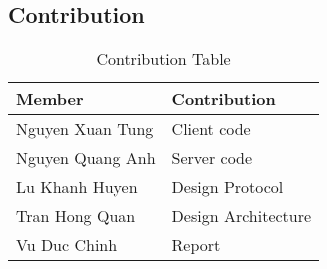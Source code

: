 \documentclass[13pt]{article}
\begin{document}
\subsection{Contribution}
\noindent%
\begin{table}[ht!]
  \begin{center}
    \label{tab:table1}
    \begin{tabular}{l|l}
      \textbf{Member} & \textbf{Contribution}\\
      \hline
      Nguyen Xuan Tung & Client code\\
      Nguyen Quang Anh & Server code\\
      Lu Khanh Huyen & Design Protocol\\
      Tran Hong Quan & Design Architecture\\
      Vu Duc Chinh & Report\\
    \end{tabular}
    \caption{Contribution Table}
  \end{center}
\end{table}
\end{document}
